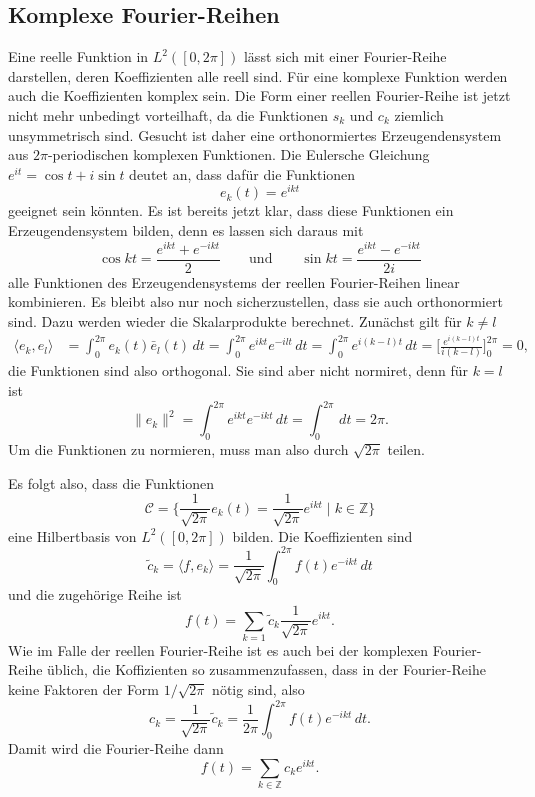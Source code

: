 \subsection{Komplexe Fourier-Reihen}
\label{subsection:complex-fourier-series}
Eine reelle Funktion in $L^2([0,2\pi])$ lässt sich mit einer Fourier-Reihe
darstellen, deren Koeffizienten alle reell sind.
Für eine komplexe Funktion werden auch die Koeffizienten komplex sein.
Die Form einer reellen Fourier-Reihe ist jetzt nicht mehr unbedingt
vorteilhaft, da die Funktionen $s_k$ und $c_k$ ziemlich unsymmetrisch
sind.
Gesucht ist daher eine orthonormiertes Erzeugendensystem aus
$2\pi$-periodischen komplexen Funktionen.
Die Eulersche Gleichung $e^{it} = \cos t + i\sin t$ deutet an, dass
dafür die Funktionen
\[
e_k(t) = e^{ikt}
\]
geeignet sein könnten.
Es ist bereits jetzt klar, dass diese Funktionen ein Erzeugendensystem
bilden, denn es lassen sich daraus mit
\[
\cos kt = \frac{e^{ikt}+e^{-ikt}}2
\qquad\text{und}\qquad
\sin kt = \frac{e^{ikt}-e^{-ikt}}{2i}
\]
alle Funktionen des Erzeugendensystems
der reellen Fourier-Reihen linear kombinieren.
Es bleibt also nur noch sicherzustellen, dass sie auch orthonormiert
sind.
Dazu werden wieder die Skalarprodukte berechnet.
Zunächst gilt für $k\ne l$
\begin{align*}
\langle e_k,e_l\rangle
&=
\int_0^{2\pi} e_k(t) \bar{e}_l(t) \,dt
=
\int_0^{2\pi} e^{ikt}e^{-ilt}\,dt
=
\int_0^{2\pi} e^{i(k-l)t}\,dt
=
\biggl[ \frac{e^{i(k-l)t}}{i(k-l)} \biggr]_0^{2\pi} 
=
0,
\end{align*}
die Funktionen sind also orthogonal.
Sie sind aber nicht normiret, denn für $k=l$ ist 
\[
\|e_k\|^2
=
\int_0^{2\pi} e^{ikt}e^{-ikt}\,dt
=
\int_0^{2\pi} \,dt = 2\pi.
\]
Um die Funktionen zu normieren, muss man also durch $\sqrt{2\pi}$ teilen.

Es folgt also, dass die Funktionen
\[
\mathcal{C}
=
\biggl\{
\frac1{\sqrt{2\pi}} e_k(t)
=
\frac1{\sqrt{2\pi}} e^{ikt}\;\bigg|\; k\in\mathbb Z
\biggr\}
\]
eine Hilbertbasis von $L^2([0,2\pi])$ bilden.
Die Koeffizienten sind 
\[
\tilde{c}_k 
=
\langle f, e_k\rangle
=
\frac1{\sqrt{2\pi}}
\int_0^{2\pi} f(t) e^{-ikt}\,dt
\]
und die zugehörige Reihe ist
\[
f(t)
=
\sum_{k=1} \tilde{c}_k \frac{1}{\sqrt{2\pi}} e^{ikt}.
\]
Wie im Falle der reellen Fourier-Reihe ist es auch bei der komplexen
Fourier-Reihe üblich, die Koffizienten so zusammenzufassen, dass in der
Fourier-Reihe keine Faktoren der Form $1/\sqrt{2\pi}$ nötig sind, also
\[
c_k
=
\frac1{\sqrt{2\pi}} \tilde{c}_k
=
\frac1{2\pi} \int_0^{2\pi} f(t) e^{-ikt}\,dt.
\]
Damit wird die Fourier-Reihe dann
\[
f(t) = \sum_{k\in\mathbb Z} c_k e^{ikt}.
\]

